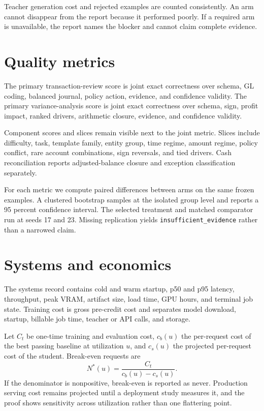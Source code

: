 \documentclass[11pt]{article}
\begin{document}
Teacher generation cost and rejected examples are counted consistently. An arm cannot disappear from the report because it performed poorly. If a required arm is unavailable, the report names the blocker and cannot claim complete evidence.

\section{Quality metrics}
The primary transaction-review score is joint exact correctness over schema, GL coding, balanced journal, policy action, evidence, and confidence validity. The primary variance-analysis score is joint exact correctness over schema, sign, profit impact, ranked drivers, arithmetic closure, evidence, and confidence validity.

Component scores and slices remain visible next to the joint metric. Slices include difficulty, task, template family, entity group, time regime, amount regime, policy conflict, rare account combinations, sign reversals, and tied drivers. Cash reconciliation reports adjusted-balance closure and exception classification separately.

For each metric we compute paired differences between arms on the same frozen examples. A clustered bootstrap samples at the isolated group level and reports a 95 percent confidence interval. The selected treatment and matched comparator run at seeds 17 and 23. Missing replication yields \texttt{insufficient\_evidence} rather than a narrowed claim.

\section{Systems and economics}
The systems record contains cold and warm startup, p50 and p95 latency, throughput, peak VRAM, artifact size, load time, GPU hours, and terminal job state. Training cost is gross pre-credit cost and separates model download, startup, billable job time, teacher or API calls, and storage.

Let $C_t$ be one-time training and evaluation cost, $c_b(u)$ the per-request cost of the best passing baseline at utilization $u$, and $c_s(u)$ the projected per-request cost of the student. Break-even requests are
\[
N^*(u)=\frac{C_t}{c_b(u)-c_s(u)}.
\]
If the denominator is nonpositive, break-even is reported as never. Production serving cost remains projected until a deployment study measures it, and the proof shows sensitivity across utilization rather than one flattering point.
\end{document}
